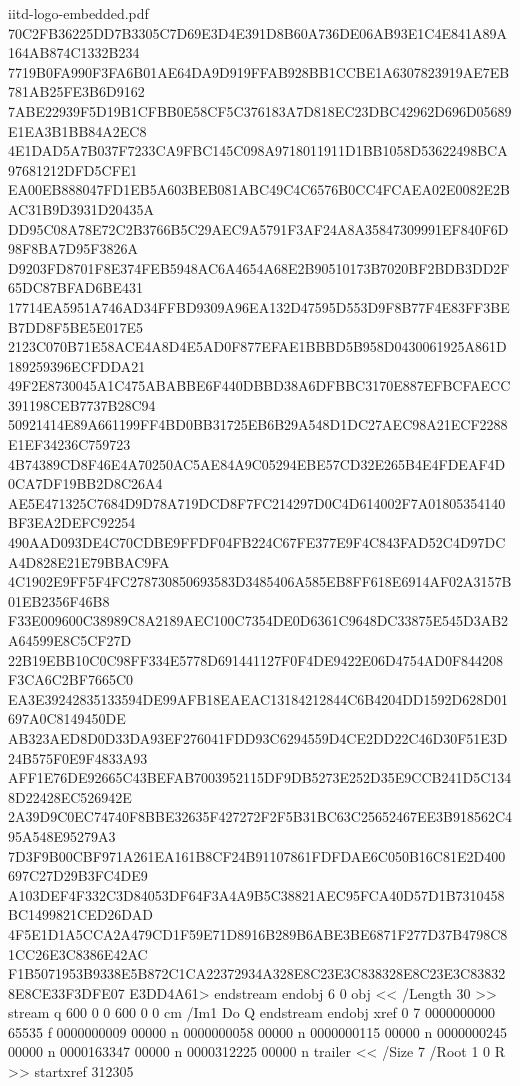 \begin{filecontents*}[overwrite]{iitd-logo-embedded.pdf}
70C2FB36225DD7B3305C7D69E3D4E391D8B60A736DE06AB93E1C4E841A89A164AB874C1332B234
7719B0FA990F3FA6B01AE64DA9D919FFAB928BB1CCBE1A6307823919AE7EB781AB25FE3B6D9162
7ABE22939F5D19B1CFBB0E58CF5C376183A7D818EC23DBC42962D696D05689E1EA3B1BB84A2EC8
4E1DAD5A7B037F7233CA9FBC145C098A9718011911D1BB1058D53622498BCA97681212DFD5CFE1
EA00EB888047FD1EB5A603BEB081ABC49C4C6576B0CC4FCAEA02E0082E2BAC31B9D3931D20435A
DD95C08A78E72C2B3766B5C29AEC9A5791F3AF24A8A35847309991EF840F6D98F8BA7D95F3826A
D9203FD8701F8E374FEB5948AC6A4654A68E2B90510173B7020BF2BDB3DD2F65DC87BFAD6BE431
17714EA5951A746AD34FFBD9309A96EA132D47595D553D9F8B77F4E83FF3BEB7DD8F5BE5E017E5
2123C070B71E58ACE4A8D4E5AD0F877EFAE1BBBD5B958D0430061925A861D189259396ECFDDA21
49F2E8730045A1C475ABABBE6F440DBBD38A6DFBBC3170E887EFBCFAECC391198CEB7737B28C94
50921414E89A661199FF4BD0BB31725EB6B29A548D1DC27AEC98A21ECF2288E1EF34236C759723
4B74389CD8F46E4A70250AC5AE84A9C05294EBE57CD32E265B4E4FDEAF4D0CA7DF19BB2D8C26A4
AE5E471325C7684D9D78A719DCD8F7FC214297D0C4D614002F7A01805354140BF3EA2DEFC92254
490AAD093DE4C70CDBE9FFDF04FB224C67FE377E9F4C843FAD52C4D97DCA4D828E21E79BBAC9FA
4C1902E9FF5F4FC278730850693583D3485406A585EB8FF618E6914AF02A3157B01EB2356F46B8
F33E009600C38989C8A2189AEC100C7354DE0D6361C9648DC33875E545D3AB2A64599E8C5CF27D
22B19EBB10C0C98FF334E5778D691441127F0F4DE9422E06D4754AD0F844208F3CA6C2BF7665C0
EA3E39242835133594DE99AFB18EAEAC13184212844C6B4204DD1592D628D01697A0C8149450DE
AB323AED8D0D33DA93EF276041FDD93C6294559D4CE2DD22C46D30F51E3D24B575F0E9F4833A93
AFF1E76DE92665C43BEFAB7003952115DF9DB5273E252D35E9CCB241D5C1348D22428EC526942E
2A39D9C0EC74740F8BBE32635F427272F2F5B31BC63C25652467EE3B918562C495A548E95279A3
7D3F9B00CBF971A261EA161B8CF24B91107861FDFDAE6C050B16C81E2D400697C27D29B3FC4DE9
A103DEF4F332C3D84053DF64F3A4A9B5C38821AEC95FCA40D57D1B7310458BC1499821CED26DAD
4F5E1D1A5CCA2A479CD1F59E71D8916B289B6ABE3BE6871F277D37B4798C81CC26E3C8386E42AC
F1B5071953B9338E5B872C1CA22372934A328E8C23E3C838328E8C23E3C838328E8CE33F3DFE07
E3DD4A61>
endstream
endobj
6 0 obj
<< /Length 30 >>
stream
q 600 0 0 600 0 0 cm /Im1 Do Q
endstream
endobj
xref
0 7
0000000000 65535 f 
0000000009 00000 n 
0000000058 00000 n 
0000000115 00000 n 
0000000245 00000 n 
0000163347 00000 n 
0000312225 00000 n 
trailer
<< /Size 7 /Root 1 0 R >>
startxref
312305
\end{filecontents*}


